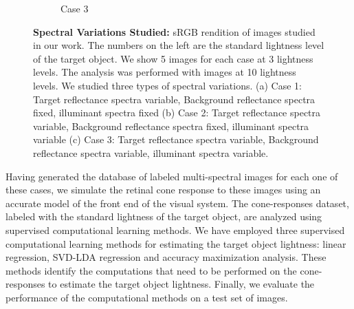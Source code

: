 \documentclass{jov}
\begin{document}
\begin{figure}
\begin{subfigure}[b]{0.33 \textwidth}
        \caption{Case 3}
        \label{fig:allSpectraVarying}
    \end{subfigure}    
    \caption{{\bf Spectral Variations Studied:} sRGB rendition of images studied in our work. The numbers on the left are the standard lightness level of the target object. We show 5 images for each case at 3 lightness levels. The analysis was performed with images at 10 lightness levels. We studied three types of spectral variations. (a) Case 1: Target reflectance spectra variable, Background reflectance spectra fixed, illuminant spectra fixed (b) Case 2: Target reflectance spectra variable, Background reflectance spectra fixed, illuminant spectra variable (c) Case 3: Target reflectance spectra variable, Background reflectance spectra variable, illuminant spectra variable.}
\label{fig:studiedCases}
\end{figure}

Having generated the database of labeled multi-spectral images for each one of these cases, we simulate the retinal cone response to these images using an accurate model of the front end of the visual system. The cone-responses dataset, labeled with the standard lightness of the target object, are analyzed using supervised computational learning methods. We have employed three supervised computational learning methods for estimating the target object lightness: linear regression, SVD-LDA regression and accuracy maximization analysis. These methods identify the computations that need to be performed on the cone-responses to estimate the target object lightness. Finally, we evaluate the performance of the computational methods on a test set of images.
\end{document}
